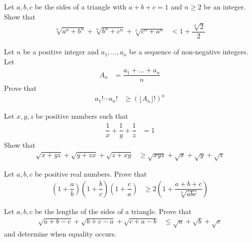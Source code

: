 \documentclass{subfile}
\begin{document}
		\begin{problem}
			Let $a,b,c$ be the sides of a triangle with $a+b+c=1$ and $n\geq2$ be an integer. Show that
				\begin{align*}
					\sqrt[n]{a^{n}+b^{n}}+\sqrt[n]{b^{n}+c^{n}}+\sqrt[n]{c^{n}+a^{n}}
						& < 1+\dfrac{\sqrt[n]{2}}{2}
				\end{align*}
		\end{problem}

		\begin{problem}
			Let $n$ be a positive integer and $a_{1},\ldots,a_{n}$ be a sequence of non-negative integers. Let
				\begin{align*}
					A_{n}
						& = \dfrac{a_{1}+\ldots+a_{n}}{n}
				\end{align*}
			Prove that
				\begin{align*}
					a_{1}!\cdots a_{n}!
						& \geq (\lfloor A_{n}\rfloor!)^{n}
				\end{align*}
		\end{problem}

		\begin{problem}
			Let $x,y,z$ be positive numbers such that
				\begin{align*}
					\dfrac{1}{x}+\dfrac{1}{y}+\dfrac{1}{z}
						& = 1
				\end{align*}
			Show that
				\begin{align*}
					\sqrt{x+yz}+\sqrt{y+zx}+\sqrt{z+xy}
						& \geq\sqrt{xyz}+\sqrt{x}+\sqrt{y}+\sqrt{z}
				\end{align*}
		\end{problem}

		\begin{problem}
			Let $a,b,c$ be positive real numbers. Prove that
				\begin{align*}
					\left(1+\dfrac{a}{b}\right)\left(1+\dfrac{b}{c}\right)\left(1+\dfrac{c}{a}\right)
						& \geq 2\left(1+\dfrac{a+b+c}{\sqrt[3]{abc}}\right)
				\end{align*}
		\end{problem}

		\begin{problem}
			Let $a,b,c$ be the lengths of the sides of a triangle. Prove that
				\begin{align*}
					\sqrt{a+b-c}+\sqrt{b+c-a}+\sqrt{c+a-b}
						& \leq \sqrt{a}+\sqrt{b}+\sqrt{c}
				\end{align*}
			and determine when equality occurs.
		\end{problem}
\end{document}
